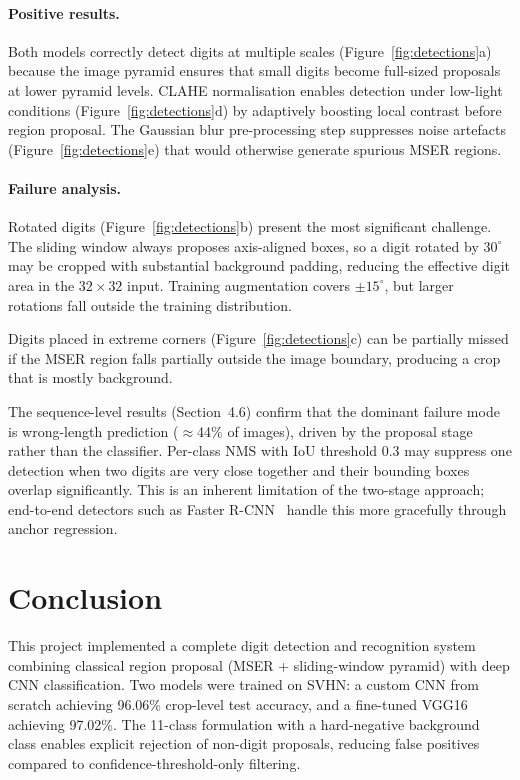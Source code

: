\documentclass[10pt,twocolumn]{article}
\begin{document}
\paragraph{Positive results.}
Both models correctly detect digits at multiple scales
(Figure~\ref{fig:detections}a) because the image pyramid ensures that
small digits become full-sized proposals at lower pyramid levels.
CLAHE normalisation enables detection under low-light conditions
(Figure~\ref{fig:detections}d) by adaptively boosting local contrast
before region proposal.
The Gaussian blur pre-processing step suppresses noise artefacts
(Figure~\ref{fig:detections}e) that would otherwise generate spurious
MSER regions.

\paragraph{Failure analysis.}
Rotated digits (Figure~\ref{fig:detections}b) present the most significant
challenge.
The sliding window always proposes axis-aligned boxes, so a digit rotated
by $30^\circ$ may be cropped with substantial background padding, reducing
the effective digit area in the $32\times32$ input.
Training augmentation covers $\pm15^\circ$, but larger rotations fall
outside the training distribution.

Digits placed in extreme corners (Figure~\ref{fig:detections}c) can be
partially missed if the MSER region falls partially outside the image
boundary, producing a crop that is mostly background.

The sequence-level results (Section~4.6) confirm that the dominant failure
mode is wrong-length prediction ($\approx$44\% of images), driven by the
proposal stage rather than the classifier.
Per-class NMS with IoU threshold 0.3 may suppress one detection when two
digits are very close together and their bounding boxes overlap
significantly.
This is an inherent limitation of the two-stage approach; end-to-end
detectors such as Faster R-CNN~\cite{ren2015fasterrcnn} handle this more
gracefully through anchor regression.

\section{Conclusion}

This project implemented a complete digit detection and recognition system
combining classical region proposal (MSER + sliding-window pyramid) with
deep CNN classification.
Two models were trained on SVHN: a custom CNN from scratch achieving
96.06\% crop-level test accuracy, and a fine-tuned VGG16 achieving 97.02\%.
The 11-class formulation with a hard-negative background class enables explicit
rejection of non-digit proposals, reducing false positives compared to
confidence-threshold-only filtering.
\end{document}
